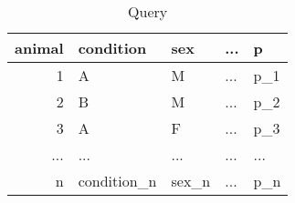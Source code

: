 \documentclass[a4paper,12pt]{article}
\begin{document}
\begin{table}[]
\centering
\caption{Query}
\label{query}
\begin{tabular}{|r|L|L|L|L|}
\hline
{} 
{\color[HTML]{333333} \textbf{animal}} & {\color[HTML]{333333} \textbf{condition}} & {\color[HTML]{333333} \textbf{sex}} & {\color[HTML]{333333} \textbf{...}} & {\color[HTML]{333333} \textbf{p}} \\ \hline
{} 
1                                      & A                                         & M                                   & ...                                 & p_1                              \\ \hline
{} 
2                                      & B                                         & M                                   & ...                                 & p_2                              \\ \hline
{} 
3                                      & A                                         & F                                   & ...                                 & p_3                              \\ \hline
{} 
...                                    & ...                                       & ...                                 & ...                                 & ...                               \\ \hline
{} 
n                                      & condition_n                              & sex_n                              & ...                                 & p_n                              \\ \hline
\end{tabular}
\end{table}
\end{document}
